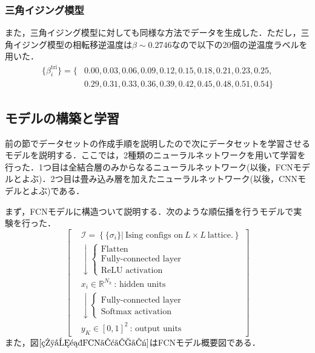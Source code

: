 \documentclass[a4paper,11pt]{jsreport}
\begin{document}
\subsubsection*{三角イジング模型}
また，三角イジング模型に対しても同様な方法でデータを生成した．ただし，三角イジング模型の相転移逆温度は$\beta \sim 0.2746$なので以下の20個の逆温度ラベルを用いた．
\begin{align*}
  \{\beta_i^{\text{tri}}\} 
  = \{ &0.00,0.03,0.06,0.09,0.12,0.15,0.18,0.21,0.23,0.25,\\
  &0.29,0.31,0.33,0.36,0.39,0.42,0.45,0.48,0.51,0.54 \}
\end{align*}

\subsection{モデルの構築と学習}
前の節でデータセットの作成手順を説明したので次にデータセットを学習させるモデルを説明する．ここでは，2種類のニューラルネットワークを用いて学習を行った．1つ目は全結合層のみからなるニューラルネットワーク(以後，FCNモデルとよぶ)．2つ目は畳み込み層を加えたニューラルネットワーク(以後，CNNモデルとよぶ)である．\par
まず，FCNモデルに構造ついて説明する．次のような順伝播を行うモデルで実験を行った．
\begin{equation}
  \left[
    \begin{aligned}
      & \mathcal{I} = \left\{ \{ \sigma_i \} \Big| \ \text{Ising configs on} \ L \times L \ \text{lattice.} \right\} \\
       & \downarrow
      \begin{cases}
        \text{Flatten} \\
        \text{Fully-connected layer} \\
        \text{ReLU activation}
      \end{cases} \\
       & x_i \in \mathbb{R}^{N_h} \ \text{: hidden units} \\
       & \downarrow
      \begin{cases}
        \text{Fully-connected layer} \\
        \text{Softmax activation}
      \end{cases} \\
       & y_K \in [0,1]^{2} \ \text{: output units}
    \end{aligned}
    \right]
\end{equation}
また，図$\ref{相分類FCNモデル}$はFCNモデル概要図である．
\end{document}
